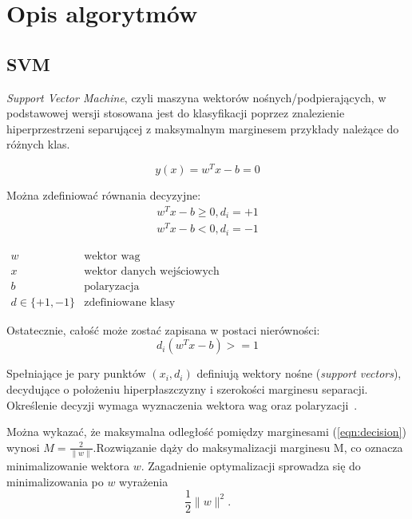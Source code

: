\section{Opis algorytmów}
\label{sec:algorytm}

\subsection{SVM}
\label{subsec:svm}

\textit{Support Vector Machine}, czyli maszyna wektorów nośnych/podpierających, w podstawowej wersji stosowana jest do klasyfikacji poprzez znalezienie hiperprzestrzeni separującej z maksymalnym marginesem przykłady należące do różnych klas.

\begin{equation}
    y(x)= w^{T}x-b = 0
\end{equation}

Można zdefiniować równania decyzyjne:
\begin{equation}
    \begin{split}
    \label{eqn:decision}
     w^{T}x-b \geq 0,  d_{i}= +1\\
      w^{T}x-b < 0,  d_{i}= -1
     \end{split}
\end{equation}


\noindent
$\displaystyle
\begin{array}{ll}
    w      & \text{wektor wag}\\
    x & \text{wektor danych wejściowych} \\
    b & \text{polaryzacja} \\
    d \in \{+1,-1\} & \text{zdefiniowane klasy}
 \end{array}
$
 
Ostatecznie, całość może zostać zapisana w postaci nierówności:
 \begin{equation}
   d_{i}(w^{T}x-b) >=1
 \end{equation}
 
Spełniające je pary punktów $(x_{i}, d_{i})$ definiują wektory nośne (\textit{support vectors}), decydujące o położeniu hiperpłaszczyzny i szerokości marginesu separacji. Określenie decyzji wymaga wyznaczenia wektora wag oraz polaryzacji~\cite{zum}.
 
Można wykazać, że  maksymalna odległość pomiędzy marginesami (\ref{eqn:decision}) wynosi $M= \frac{2}{\| w \|}$.Rozwiązanie dąży do maksymalizacji marginesu M, co oznacza minimalizowanie wektora $w$. Zagadnienie optymalizacji sprowadza się do minimalizowania po $w$ wyrażenia 
\begin{equation}
\label{eqn:minimum2}
    \frac{1}{2}\| w \|^2.
\end{equation}


